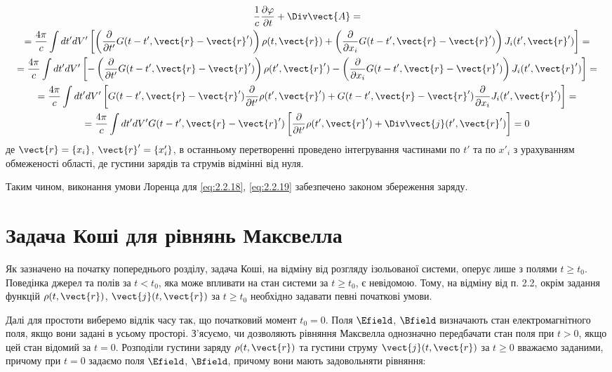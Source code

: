 \begin{multline*}
\frac{1}{c} \frac{\partial \varphi}{\partial t} + \Div\vect{A} = \\
= \frac{4\pi}{c} \int dt' dV' \left[ \left( \frac{\partial}{\partial t'} G(t - t', \vect{r} - \vect{r}') \right) \rho (t, \vect{r}) + \left(
\frac{\partial}{\partial x_i} G(t - t', \vect{r} - \vect{r}') \right) J_i (t', \vect{r}') \right] = \\
= \frac{4\pi}{c} \int dt' dV' \left[ - \left( \frac{\partial}{\partial t'} G(t - t', \vect{r} - \vect{r}') \right) \rho (t', \vect{r}') - \left(
\frac{\partial}{\partial x_i} G(t - t', \vect{r} - \vect{r}') \right) J_i (t', \vect{r}') \right] = \\
= \frac{4\pi}{c} \int dt' dV' \left[ G(t - t', \vect{r} - \vect{r}') \frac{\partial}{\partial t'} \rho (t', \vect{r}') + G(t - t', \vect{r} -
\vect{r}') \frac{\partial}{\partial x_i} J_i (t', \vect{r}') \right] = \\
= \frac{4\pi}{c} \int dt' dV' G(t - t', \vect{r} - \vect{r}') \left[ \frac{\partial}{\partial t'} \rho (t', \vect{r}') + \Div\vect{j}
(t', \vect{r}') \right] = 0
\end{multline*}
де \( \vect{r} = \{ x_i \} \), \( \vect{r}' = \{ x'_i \} \), в останньому перетворенні проведено інтегрування частинами по \( t' \) та по \( x'_i \) з
урахуванням обмеженості області, де густини зарядів та струмів відмінні від нуля.

Таким чином, виконання умови Лоренца для \eqref{eq:2.2.18}, \eqref{eq:2.2.19} забезпечено законом збереження заряду.

\section{Задача Коші для рівнянь Максвелла}\label{sec:Cauchi}

Як зазначено на початку попереднього розділу, задача Коші, на відміну від розгляду ізольованої системи, оперує лише з полями \( t \geq t_0 \). Поведінка
джерел та полів за \( t < t_0 \), яка може впливати на стан системи за \( t \geq t_0 \), є невідомою. Тому, на відміну від п. 2.2, окрім задання функцій
\( \rho(t, \vect{r}) \), \( \vect{j}(t, \vect{r}) \) за \( t \geq t_0 \) необхідно задавати певні початкові умови.

Далі для простоти виберемо відлік часу так, що початковий момент \( t_0 = 0 \). Поля \( \Efield \), \( \Bfield \) визначають стан електромагнітного
поля, якщо вони задані в усьому просторі. З’ясуємо, чи дозволяють рівняння Максвелла однозначно передбачати стан поля при \( t > 0 \), якщо цей стан
відомий за \( t = 0 \). Розподіли густини заряду \( \rho(t, \vect{r}) \) та густини струму \( \vect{j}(t, \vect{r}) \) за \( t \geq 0 \) вважаємо
заданими, причому при \( t = 0 \) задаємо поля \( \Efield \), \( \Bfield \), причому вони мають задовольняти рівняння:

